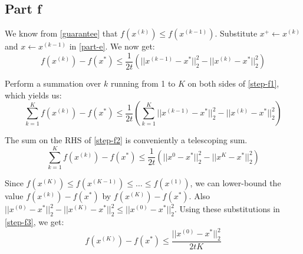 \documentclass[10.5pt]{article}
\begin{document}
\subsection*{Part f}
\begin{flushleft}
We know from \ref{guarantee} that \(f(x^{(k)}) \leq f(x^{(k-1)})\). Substitute \(x^{+} \leftarrow x^{(k)}\) and \(x \leftarrow x^{(k-1)}\) in \ref{part-e}. We now get:
\begin{equation}
\label{step-f1}
f(x^{(k)}) - f(x^{*}) \leq \frac{1}{2t}\left(||x^{(k-1)} - x^{*}||_{2}^{2} - ||x^{(k)} - x^{*}||_2^{2}\right)
\end{equation}

Perform a summation over \(k\) running from 1 to \(K\) on both sides of \ref{step-f1}, which yields us:
\begin{equation}
\label{step-f2}
\displaystyle \sum_{k=1}^{K} f(x^{(k)}) - f(x^{*}) \leq \frac{1}{2t} \left(\sum_{k=1}^{K} ||x^{(k-1)} - x^{*}||_{2}^{2} - ||x^{(k)} - x^{*}||_2^{2}\right)
\end{equation}

The sum on the RHS of \ref{step-f2} is conveniently a telescoping sum.
\begin{equation}
\label{step-f3}
\displaystyle \sum_{k=1}^{K} f(x^{(k)}) - f(x^{*}) \leq \frac{1}{2t} \left(||x^{0} - x^{*}||_{2}^{2} - ||x^{K} - x^{*}||_{2}^{2}\right)
\end{equation}

Since \(f(x^{(K)}) \leq f(x^{(K-1)}) \leq \ldots \leq f(x^{(1)})\), we can lower-bound the value \(f(x^{(k)}) - f(x^{*})\) by \(f(x^{(K)}) - f(x^{*})\). Also \(||x^{(0)} - x^{*}||_{2}^{2} - ||x^{(K)} - x^{*}||_{2}^{2} \leq ||x^{(0)} - x^{*}||_{2}^{2}\). Using these substitutions in \ref{step-f3}, we get:
\begin{equation}
\label{part-f}
f(x^{(K)}) - f(x^{*}) \leq \frac{||x^{(0)} - x^{*}||_{2}^{2}}{2tK}
\end{equation}
\end{flushleft}
\end{document}
